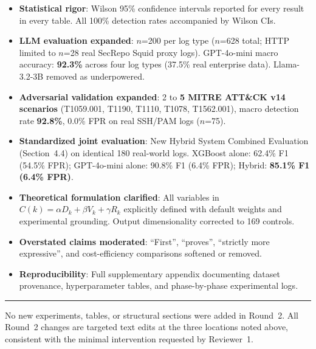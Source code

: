 \documentclass[12pt, a4paper]{article}
\begin{document}
\begin{itemize}
  \item \textbf{Statistical rigor}: Wilson 95\% confidence intervals reported for every
        result in every table. All 100\% detection rates accompanied by Wilson CIs.

  \item \textbf{LLM evaluation expanded}: $n$=200 per log type ($n$=628 total; HTTP
        limited to $n$=28 real SecRepo Squid proxy logs). GPT-4o-mini macro accuracy:
        \textbf{92.3\%} across four log types (37.5\% real enterprise data). Llama-3.2-3B
        removed as underpowered.

  \item \textbf{Adversarial validation expanded}: 2 to \textbf{5 MITRE ATT\&CK v14
        scenarios} (T1059.001, T1190, T1110, T1078, T1562.001), macro detection rate
        \textbf{92.8\%}, 0.0\% FPR on real SSH/PAM logs ($n$=75).

  \item \textbf{Standardized joint evaluation}: New Hybrid System Combined Evaluation
        (Section~4.4) on identical 180 real-world logs. XGBoost alone: 62.4\% F1 (54.5\%
        FPR); GPT-4o-mini alone: 90.8\% F1 (6.4\% FPR); Hybrid: \textbf{85.1\% F1
        (6.4\% FPR)}.

  \item \textbf{Theoretical formulation clarified}: All variables in
        $C(k) = \alpha D_k + \beta V_k + \gamma R_k$ explicitly defined with default
        weights and experimental grounding. Output dimensionality corrected to 169 controls.

  \item \textbf{Overstated claims moderated}: ``First'', ``proves'', ``strictly more
        expressive'', and cost-efficiency comparisons softened or removed.

  \item \textbf{Reproducibility}: Full supplementary appendix documenting dataset
        provenance, hyperparameter tables, and phase-by-phase experimental logs.
\end{itemize}

\vspace{0.4cm}
\noindent\rule{\textwidth}{0.4pt}
\vspace{0.2cm}

No new experiments, tables, or structural sections were added in Round~2. All Round~2
changes are targeted text edits at the three locations noted above, consistent with the
minimal intervention requested by Reviewer~1.
\end{document}
